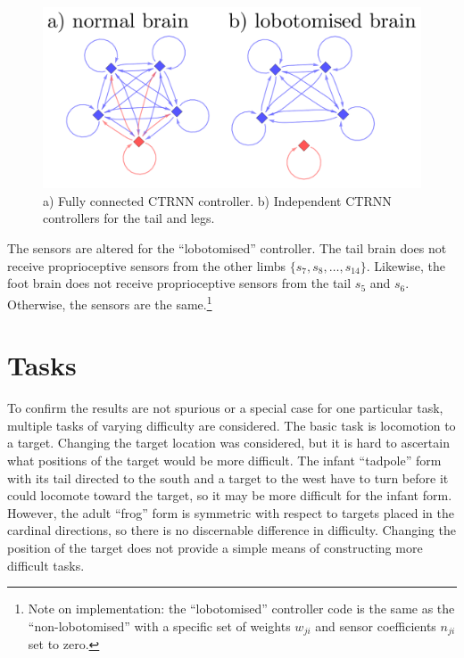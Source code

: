 \begin{figure}[h]
  \centering
  \includegraphics[width=5in]{fig/ctrnn-figures.pdf}
  \vspace{-15pt}
  \caption[Variation of CTRNN controllers]{\label{ctrnn-figures}a)
    Fully connected CTRNN controller. b) Independent CTRNN controllers
    for the tail and legs.}
\end{figure}

The sensors are altered for the ``lobotomised'' controller.  The tail
brain does not receive proprioceptive sensors from the other limbs
$\{s_7, s_8, \ldots, s_14\}$.  Likewise, the foot brain does not
receive proprioceptive sensors from the tail $s_5$ and $s_6$.
Otherwise, the sensors are the same.\footnote{Note on implementation:
  the ``lobotomised'' controller code is the same as the
  ``non-lobotomised'' with a specific set of weights $w_{ji}$ and
  sensor coefficients $n_{ji}$ set to zero.}

\section{Tasks}

To confirm the results are not spurious or a special case for one
particular task, multiple tasks of varying difficulty are considered.
The basic task is locomotion to a target.  Changing the target
location was considered, but it is hard to ascertain what positions of
the target would be more difficult.  The infant ``tadpole'' form with
its tail directed to the south and a target to the west have to turn
before it could locomote toward the target, so it may be more
difficult for the infant form.  However, the adult ``frog'' form is
symmetric with respect to targets placed in the cardinal directions,
so there is no discernable difference in difficulty.  Changing the
position of the target does not provide a simple means of constructing
more difficult tasks.  

